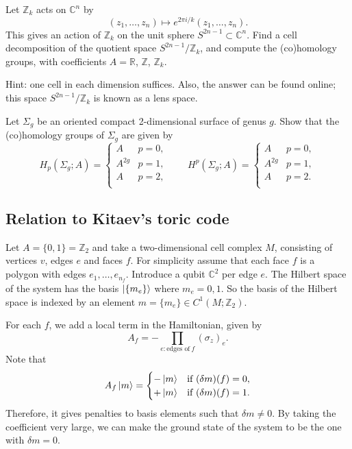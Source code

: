 \documentclass[12pt]{article}
\numberwithin{equation}{section}
\theoremstyle{remark}
\def\bC{\mathbb{C}}
\def\bR{\mathbb{R}}
\def\bZ{\mathbb{Z}}
\begin{document}
\begin{question}
Let $\bZ_k$ acts on $\bC^n$ by \begin{equation}
   (z_1,\ldots,z_n) \mapsto e^{2\pi i/k}(z_1,\ldots,z_n).
\end{equation} 
This gives an action of $\bZ_k$ on the unit sphere $S^{2n-1}\subset \bC^n$.
Find a cell decomposition of the quotient space $S^{2n-1}/\bZ_k$,
and compute the (co)homology groups, with coefficients $A=\bR$, $\bZ$, $\bZ_k$.
\end{question}
Hint: one cell in each dimension suffices. 
Also, the answer can be found online; this space $S^{2n-1}/\bZ_k$ is known as a lens space.

\begin{question}
Let $\Sigma_g$ be an oriented compact 2-dimensional surface of genus $g$.
Show that the (co)homology groups of $\Sigma_g$ are given by \begin{equation}
H_p(\Sigma_g;A) = \begin{cases} 
  A & p=0, \\ 
  A^{2g} & p=1, \\
  A & p=2, \\
\end{cases}\qquad
H^p(\Sigma_g;A) =\begin{cases} 
  A & p=0, \\ 
  A^{2g} & p=1, \\
  A & p=2. \\
\end{cases}
\end{equation}
\end{question}

\subsection{Relation to Kitaev's toric code}

Let $A=\{0,1\}=\bZ_2$ and take a two-dimensional cell complex $M$,
consisting of vertices $v$, edges $e$ and faces $f$.
For simplicity assume that each face $f$ is a polygon with edges $e_1,\ldots,e_{n_f}$.
Introduce a qubit $\bC^2$ per edge $e$.
The Hilbert space of the system has the basis $\ket{\{m_e\}}$ where $m_e=0,1$.
So the basis of the Hilbert space is indexed by an element $m=\{m_e\}\in C^1(M;\bZ_2)$.

For each $f$, we add a local term in the Hamiltonian, 
given by 
\begin{equation}
  A_f=-\prod_{e: \text{edges of}\ f} (\sigma_z)_e.
\end{equation}
Note that 
\begin{equation}
A_f \ket{m} = \begin{cases}
  -\ket{m} & \text{if}\ (\delta m)(f)=0,\\
  +\ket{m} & \text{if}\ (\delta m)(f)=1.
\end{cases}
\end{equation}
Therefore, it gives penalties to basis elements such that $\delta m\neq 0$.
By taking the coefficient very large, we can make the ground state of the system to be the one with $\delta m=0$.
\end{document}
